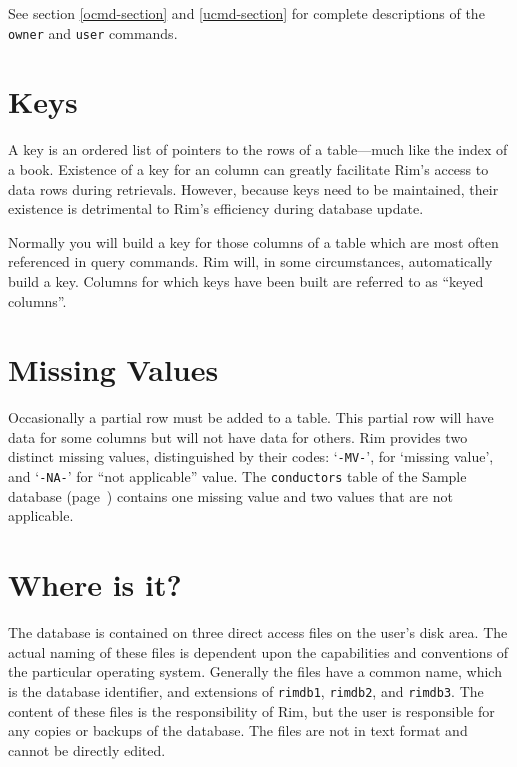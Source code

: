 \documentclass[11pt,a4paper]{report}
\begin{document}
See section \ref{ocmd-section} and \ref{ucmd-section} for
complete descriptions of the \verb!owner! and \verb!user! commands.
 
\section{Keys}
A key is an ordered list of pointers to the rows of
a table---much like the index of a book.
Existence of a key for an column can greatly
facilitate Rim's access to data rows during retrievals.
However, because keys need to be maintained, their
existence is detrimental to Rim's efficiency during database update.
 
Normally you will build a key for those columns
of a table which are most often referenced in query commands.
Rim will, in some circumstances, automatically build a key.
Columns for which keys have been built are referred to as
``keyed columns''.
 
 
 
\section{Missing Values}
Occasionally a partial row must be added to a table.
This partial row will have data for some columns but
will not have data for others.  Rim provides two distinct
missing values, distinguished by their codes:
`\verb!-MV-!', for `missing value',
and `\verb!-NA-!' for ``not applicable'' value.
The \verb!conductors! table of the Sample database (page~\pageref{Sample})
contains one missing value and two values that are not applicable.
 
\section{Where is it?}
The database is contained on three direct access files
on the user's disk area.  The actual naming of these files
is dependent upon the capabilities and conventions of
the particular operating system.
Generally the
files have a common name, which is the database identifier,
and extensions of {\tt rimdb1}, {\tt rimdb2}, and
{\tt rimdb3}.
The content of these files is the responsibility of Rim,
but the user is responsible for any copies or backups
of the database.
The files are not in text format and cannot be directly
edited.
 
 
 
 
\end{document}
